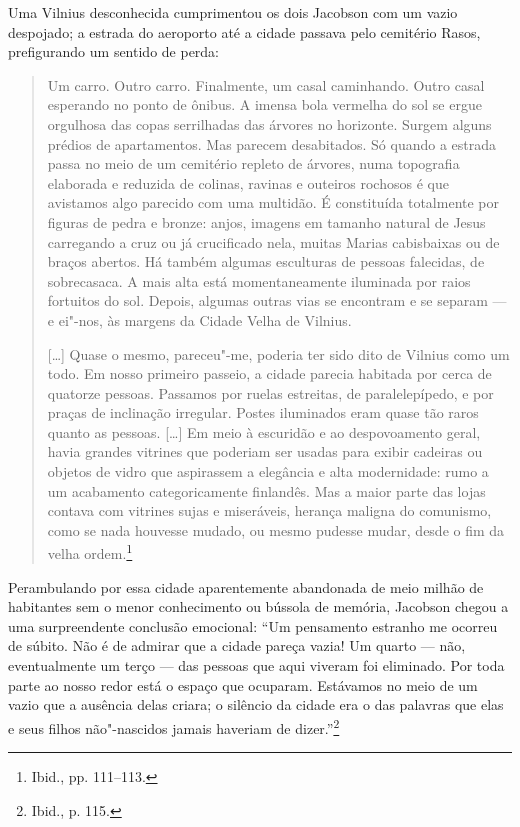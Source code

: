 Uma Vilnius desconhecida cumprimentou os dois Jacobson com um vazio
despojado; a estrada do aeroporto até a cidade passava pelo cemitério
Rasos, prefigurando um sentido de perda:

\begin{quote}
Um carro. Outro carro. Finalmente, um casal caminhando. Outro casal
esperando no ponto de ônibus. A imensa bola vermelha do sol se ergue
orgulhosa das copas serrilhadas das árvores no horizonte. Surgem alguns
prédios de apartamentos. Mas parecem desabitados. Só quando a estrada
passa no meio de um cemitério repleto de árvores, numa topografia
elaborada e reduzida de colinas, ravinas e outeiros rochosos é que
avistamos algo parecido com uma multidão. É constituída totalmente por
figuras de pedra e bronze: anjos, imagens em tamanho natural de Jesus
carregando a cruz ou já crucificado nela, muitas Marias cabisbaixas ou
de braços abertos. Há também algumas esculturas de pessoas falecidas, de
sobrecasaca. A mais alta está momentaneamente iluminada por raios
fortuitos do sol. Depois, algumas outras vias se encontram e se separam
--- e ei"-nos, às margens da Cidade Velha de Vilnius.

[\ldots{}] Quase o mesmo, pareceu"-me, poderia ter sido dito de Vilnius como
um todo. Em nosso primeiro passeio, a cidade parecia habitada por cerca
de quatorze pessoas. Passamos por ruelas estreitas, de paralelepípedo, e
por praças de inclinação irregular. Postes iluminados eram quase tão
raros quanto as pessoas. [\ldots{}] Em meio à escuridão e ao despovoamento
geral, havia grandes vitrines que poderiam ser usadas para exibir
cadeiras ou objetos de vidro que aspirassem a elegância e alta
modernidade: rumo a um acabamento categoricamente finlandês. Mas a maior
parte das lojas contava com vitrines sujas e miseráveis, herança maligna
do comunismo, como se nada houvesse mudado, ou mesmo pudesse mudar,
desde o fim da velha ordem.\footnote{Ibid., pp. 111--113.}
\end{quote}

Perambulando por essa cidade aparentemente abandonada de meio milhão de
habitantes sem o menor conhecimento ou bússola de memória, Jacobson
chegou a uma surpreendente conclusão emocional: ``Um pensamento estranho
me ocorreu de súbito. Não é de admirar que a cidade pareça vazia! Um
quarto --- não, eventualmente um terço --- das pessoas que aqui viveram foi
eliminado. Por toda parte ao nosso redor está o espaço que ocuparam.
Estávamos no meio de um vazio que a ausência delas criara; o silêncio da
cidade era o das palavras que elas e seus filhos não"-nascidos jamais
haveriam de dizer.''\footnote{Ibid., p. 115.}

